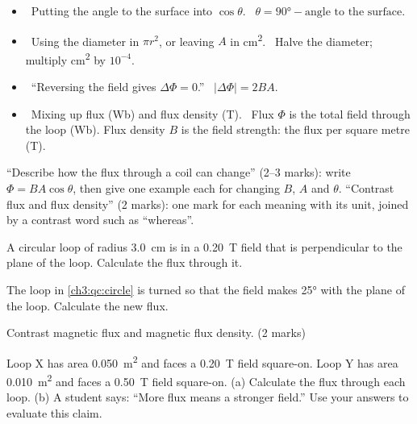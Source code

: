 \begin{mistakes}
\begin{itemize}
  \item \xmark\ Putting the angle to the surface into $\cos\theta$.
        \cmark\ $\theta = \ang{90} - \text{angle to the surface}$.
  \item \xmark\ Using the diameter in $\pi r^2$, or leaving $A$ in \si{cm^2}.
        \cmark\ Halve the diameter; multiply \si{cm^2} by $10^{-4}$.
  \item \xmark\ ``Reversing the field gives $\Delta\Phi = 0$.''
        \cmark\ $\lvert\Delta\Phi\rvert = 2BA$.
  \item \xmark\ Mixing up flux (\si{Wb}) and flux density (\si{T}).
        \cmark\ Flux $\Phi$ is the total field through the loop (\si{Wb}). Flux
        density $B$ is the field strength: the flux per square metre (\si{T}).
\end{itemize}
\end{mistakes}

\begin{examtip}
``Describe how the flux through a coil can change'' (2--3 marks): write
$\Phi = BA\cos\theta$, then give one example each for changing $B$, $A$ and
$\theta$. ``Contrast flux and flux density'' (2 marks): one mark for each meaning
with its unit, joined by a contrast word such as ``whereas''.
\end{examtip}

\begin{quickcheck}
  \item A circular loop of radius \qty{3.0}{cm} is in a \qty{0.20}{T} field that is
        perpendicular to the plane of the loop. Calculate the flux through
        it.\label{ch3:qc:circle}
  \item The loop in \cref{ch3:qc:circle} is turned so that the field makes \ang{25}
        with the plane of the loop. Calculate the new flux.
  \item Contrast magnetic flux and magnetic flux density. (2 marks)
  \item Loop X has area \qty{0.050}{m^2} and faces a \qty{0.20}{T} field
        square-on. Loop Y has area \qty{0.010}{m^2} and faces a \qty{0.50}{T}
        field square-on. (a) Calculate the flux through each loop. (b) A student
        says: ``More flux means a stronger field.'' Use your answers to evaluate
        this claim.
\end{quickcheck}

